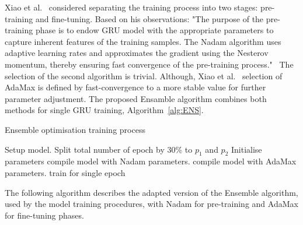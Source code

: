 %
%
Xiao et al.~\cite{xiao_accurate_2019} considered separating the training process into two stages: pre-training and fine-tuning.
Based on his observations: "The purpose of the pre-training phase is to endow GRU model with the appropriate parameters to capture inherent features of the training samples.
The Nadam algorithm uses adaptive learning rates and approximates the gradient using the Nesterov momentum, thereby ensuring fast convergence of the pre-training process."~\cite{xiao_accurate_2019}
The selection of the second algorithm is trivial.
Although, Xiao et al.~\cite{xiao_accurate_2019} selection of AdaMax is defined by fast-convergence to a more stable value for further parameter adjustment.
The proposed Ensamble algorithm combines both methods for single GRU training, Algorithm~\ref{alg:ENS}.
\begin{algorithm}
    \caption{Ensemble optimisation training process}
        \begin{algorithmic}[1]
            \STATE Setup model. Split total number of epoch by 30\% to $p_{1}$ and $p_{2}$
            \STATE Initialise parameters
                    \STATE {}
                    \STATE compile model with Nadam parameters. 
                \ELSE
                    \STATE {}
                    \STATE compile model with AdaMax parameters. 
                \ENDIF
                \STATE train for single epoch
            \ENDWHILE
        \end{algorithmic}
    \label{alg:ENS}
\end{algorithm}
The following algorithm describes the adapted version of the Ensemble algorithm, used by the model training procedures, with Nadam for pre-training and AdaMax for fine-tuning phases.

